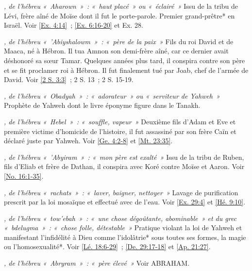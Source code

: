 \begin{multicols}{2}

\textit{, de l'hébreu «~Aharown~»~: «~haut placé~» ou «~éclairé~»}\newline
Issu de la tribu de Lévi, frère aîné de Moïse dont il fut le porte-parole. Premier grand-prêtre* en Israël. Voir \vref{Ex. 4:14}~; \vref{Ex. 6:16-20} et Ex. 28.

\textit{, de l'hébreu «~'Abiyshalowm~»~: «~père de la paix~»}\newline
Fils du roi David et de Maaca, né à Hébron. Il tua Amnon son demi-frère aîné, car ce dernier avait déshonoré sa sœur Tamar. Quelques années plus tard, il conspira contre son père et se fit proclamer roi à Hébron. Il fut finalement tué par Joab, chef de l'armée de David. Voir \vref{2 S. 3:3}~; 2 S. 13~; 2 S. 15-19.

\textit{, de l'hébreu «~Obadyah~»~: «~adorateur~» ou «~serviteur de Yahweh~»}\newline
Prophète de Yahweh dont le livre éponyme figure dans le Tanakh.

\textit{, de l'hébreu «~Hebel~»~: «~souffle, vapeur~»}\newline
Deuxième fils d'Adam et Eve et première victime d'homicide de l'histoire, il fut assassiné par son frère Caïn et déclaré juste par Yahweh. Voir \vref{Ge. 4:2-8} et \vref{Mt. 23:35}.

\textit{, de l'hébreu «~'Abyiram~»~: «~mon père est exalté~»}\newline
Issu de la tribu de Ruben, fils d'Eliab et frère de Dathan, il conspira avec Koré contre Moïse et Aaron. Voir \vref{No. 16:1-35}.

\textit{, de l'hébreu «~rachats~»~: «~laver, baigner, nettoyer~»}\newline
Lavage de purification prescrit par la loi mosaïque et effectué avec de l'eau. Voir \vref{Ex. 29:4} et \vref{Hé. 9:10}.

\textit{, de l'hébreu «~tow'ebah~»~: «~une chose dégoûtante, abominable~» et du grec «~bdelugma~»~: «~chose folle, détestable~»}\newline
Pratique violant la loi de Yahweh et manifestant l'infidélité à Dieu comme l'idolâtrie* sous toutes ses formes, la magie ou l'homosexualité*. Voir \vref{Lé. 18:6-29}~; \vref{De. 29:17-18} et \vref{Ap. 21:27}.

\textit{, de l'hébreu «~Abryram~»~: «~père élevé~»}\newline
Voir ABRAHAM.


\end{multicols}
